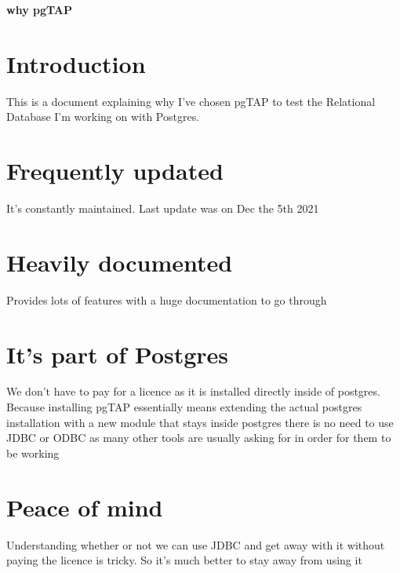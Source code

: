 \documentclass[a4paper,12pt]{article}
\begin{document}
\textbf{why pgTAP}
\tableofcontents

\section{Introduction}

This is a document explaining why I've chosen pgTAP to test the Relational Database I'm working on with Postgres.

\section{Frequently updated}
It's constantly maintained. Last update was on Dec the 5th 2021

\section{Heavily documented}
Provides lots of features with a huge documentation to go through

\section{It's part of Postgres}
We don't have to pay for a licence as it is installed directly inside of postgres. Because installing pgTAP essentially means extending the actual postgres installation with a new module that stays inside postgres there is no need to use JDBC or ODBC as many other tools are usually asking for in order for them to be working


\section{Peace of mind}
Understanding whether or not we can use JDBC and get away with it without paying the licence is tricky. So it's much better to stay away from using it


\printindex
\end{document}
